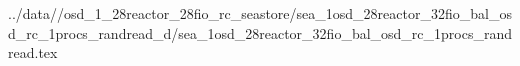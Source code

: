 ../data//osd_1_28reactor_28fio_rc_seastore/sea_1osd_28reactor_32fio_bal_osd_rc_1procs_randread_d/sea_1osd_28reactor_32fio_bal_osd_rc_1procs_randread.tex